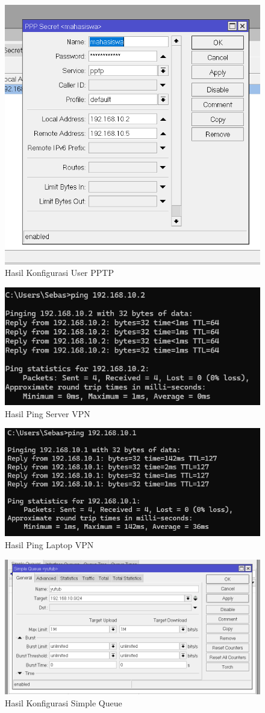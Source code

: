 \begin{figure}[htbp]
  \centering
  \includegraphics[width=0.5\linewidth]{dokum/Laptop 2/PAssword PPP.png}
  \caption{Hasil Konfigurasi User PPTP}
  \label{fig:pptp-user}
\end{figure}

\begin{figure}[htbp]
  \centering
  \includegraphics[width=0.5\linewidth]{dokum/ping server.png}
  \caption{Hasil Ping Server VPN}
  \label{fig:ping-vpn-server}
\end{figure}

\begin{figure}[htbp]
  \centering
  \includegraphics[width=0.5\linewidth]{dokum/ping pc2.png}
  \caption{Hasil Ping Laptop VPN}
  \label{fig:ping-vpn-laptop}
\end{figure}

\begin{figure}[htbp]
  \centering
  \includegraphics[width=0.5\linewidth]{dokum/Laptop 2/Simple Queq.png}
  \caption{Hasil Konfigurasi Simple Queue}
  \label{fig:queue}
\end{figure}

